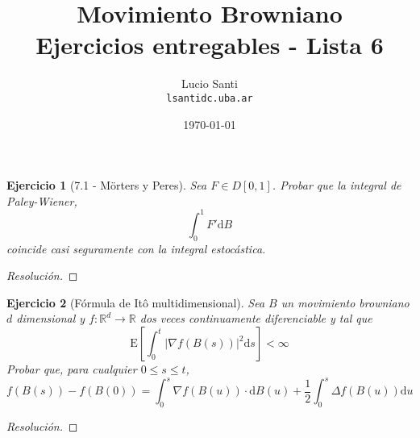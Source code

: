 \documentclass[a4paper,11pt]{article}
\title{Movimiento Browniano\\
      \small{Ejercicios entregables - Lista 6}}
\author{Lucio Santi\\
        \texttt{lsanti\at dc.uba.ar}}
\date{\today}
\newcommand{\abs}[1]{\ensuremath{\left\lvert #1 \right\rvert}}
\newcommand{\Exp}[1]{\ensuremath{\textrm{E}\left[#1\right]}}
\newcommand{\Real}{\mathbb{R}}
\newcommand{\Grad}[1]{\nabla #1}
\newcommand{\Lap}[1]{\Delta #1 }
\newcommand{\Dif}[1]{\textrm{d} #1}
\newtheorem*{ej}{Ejercicio}
\begin{document}
\maketitle

\begin{ej}[7.1 - Mörters y Peres] 
Sea $F \in D[0,1]$. Probar que la integral de Paley-Wiener,
$$\int_0^1{F' \Dif{B}}$$
coincide casi seguramente con la integral estocástica.
\end{ej}

\begin{proof}[Resoluci\'on]

\end{proof}


\begin{ej}[Fórmula de Itô multidimensional] 
Sea $B$ un movimiento browniano $d$ dimensional y $f : \Real^d \to \Real$ dos veces continuamente
diferenciable y tal que
$$\Exp{ \int_0^t{\abs{\Grad{f(B(s))}}}^2 \Dif{s}} < \infty$$
Probar que, para cualquier $0 \leq s \leq t$,
$$f(B(s)) - f(B(0)) = \int_0^s{\Grad{f(B(u))} \cdot \Dif{B(u)}} + \frac{1}{2} \int_0^s{\Lap{f(B(u))} \Dif{u}}$$
\end{ej}

\begin{proof}[Resoluci\'on]

\end{proof}
\end{document}
